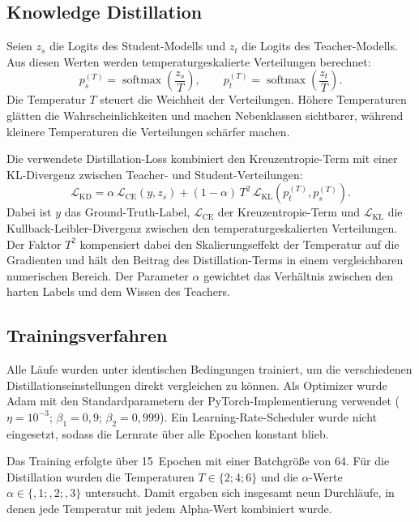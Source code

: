 \subsection{Knowledge Distillation}
\label{subsec:distillation}

Seien $z_s$ die Logits des Student-Modells und $z_t$ die Logits des Teacher-Modells.
Aus diesen Werten werden temperaturgeskalierte Verteilungen berechnet:
\begin{equation}
  p_s^{(T)} = \operatorname{softmax}\left(\frac{z_s}{T}\right),
  \qquad
  p_t^{(T)} = \operatorname{softmax}\left(\frac{z_t}{T}\right).
\end{equation}
Die Temperatur $T$ steuert die Weichheit der Verteilungen. Höhere Temperaturen glätten die Wahrscheinlichkeiten und machen Nebenklassen sichtbarer, während kleinere Temperaturen die Verteilungen schärfer machen.

Die verwendete Distillation-Loss kombiniert den Kreuzentropie-Term mit einer KL-Divergenz zwischen Teacher- und Student-Verteilungen:
\begin{equation}
  \mathcal{L}_{\mathrm{KD}} = \alpha \, \mathcal{L}_{\mathrm{CE}}(y, z_s)
  + (1-\alpha) \, T^2 \, \mathcal{L}_{\mathrm{KL}}\left(p_t^{(T)}, p_s^{(T)}\right).
\end{equation}
Dabei ist $y$ das Ground-Truth-Label, $\mathcal{L}_{\mathrm{CE}}$ der Kreuzentropie-Term und $\mathcal{L}_{\mathrm{KL}}$ die Kullback-Leibler-Divergenz zwischen den temperaturgeskalierten Verteilungen.
Der Faktor $T^2$ kompensiert dabei den Skalierungseffekt der Temperatur auf die Gradienten und hält den Beitrag des Distillation-Terms in einem vergleichbaren numerischen Bereich.
Der Parameter $\alpha$ gewichtet das Verhältnis zwischen den harten Labels und dem Wissen des Teachers.

\subsection{Trainingsverfahren}
\label{subsec:training}

Alle Läufe wurden unter identischen Bedingungen trainiert, um die verschiedenen Distillationseinstellungen direkt vergleichen zu können.
Als Optimizer wurde Adam mit den Standardparametern der PyTorch-Implementierung verwendet ($\eta = 10^{-3}$; $\beta_1 = 0{,}9$; $\beta_2 = 0{,}999$).
Ein Learning-Rate-Scheduler wurde nicht eingesetzt, sodass die Lernrate über alle Epochen konstant blieb.

Das Training erfolgte über 15~Epochen mit einer Batchgröße von 64.
Für die Distillation wurden die Temperaturen $T \in \{2; 4; 6\}$ und die $\alpha$-Werte $\alpha \in \{{,}1; {,}2; {,}3\}$ untersucht.
Damit ergaben sich insgesamt neun Durchläufe, in denen jede Temperatur mit jedem Alpha-Wert kombiniert wurde.

